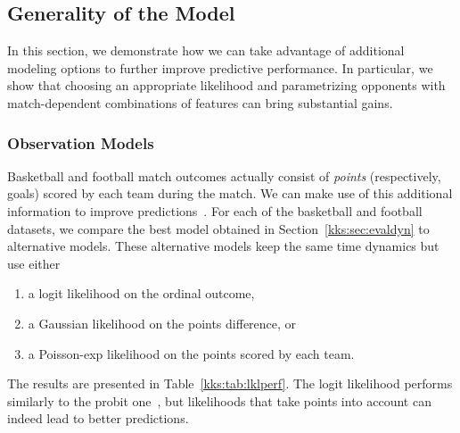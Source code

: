 

\subsection{Generality of the Model}
\label{kks:sec:evalgen}

In this section, we demonstrate how we can take advantage of additional modeling options to further improve predictive performance.
In particular, we show that
choosing an appropriate likelihood and
parametrizing opponents with match-dependent combinations of features
can bring substantial gains.


\subsubsection{Observation Models}
Basketball and football match outcomes actually consist of \emph{points} (respectively, goals) scored by each team during the match.
We can make use of this additional information to improve predictions~\citep{maher1982modelling}.
For each of the basketball and football datasets, we compare the best model obtained in Section~\ref{kks:sec:evaldyn} to alternative models.
These alternative models keep the same time dynamics but use either
\begin{enumerate}
	\item a logit likelihood on the ordinal outcome,
	\item a Gaussian likelihood on the points difference, or
	\item a Poisson-exp likelihood on the points scored by each team.
\end{enumerate}
The results are presented in Table~\ref{kks:tab:lklperf}.
The logit likelihood performs similarly to the probit one~\citep{stern1992all}, but likelihoods that take points into account can indeed lead to better predictions.

